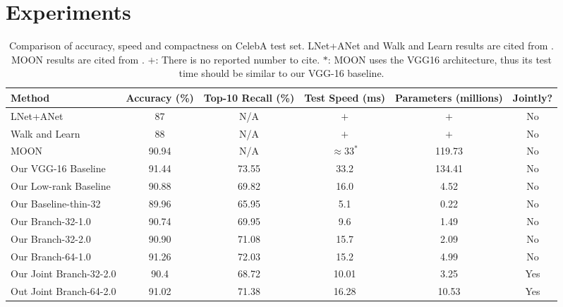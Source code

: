 \documentclass[10pt,twocolumn,letterpaper]{article}
\begin{document}
\section{Experiments}

\begin{table*}
	\begin{center} \small
		\begin{tabular}{|l|c|c|c|c|c|}
			\hline
			\bf Method & \bf Accuracy (\%) & \bf Top-10 Recall (\%) & \bf Test Speed (ms) & \bf Parameters (millions) & \bf Jointly? \\ \hline
			LNet+ANet & 87 & N/A & $+$ & $+$ & No \\
			Walk and Learn & 88 & N/A & $+$ & $+$ & No \\
			MOON & 90.94 & N/A & $\approx 33^*$ & 119.73 & No \\ \hline
			Our VGG-16 Baseline & 91.44 & 73.55 & 33.2 & 134.41 & No \\
			Our Low-rank Baseline & 90.88 & 69.82 & 16.0 & 4.52 & No \\
			Our Baseline-thin-32 & 89.96 & 65.95 & 5.1 & 0.22 & No \\ \hline
			Our Branch-32-1.0 & 90.74 & 69.95 & 9.6 & 1.49 & No \\
			Our Branch-32-2.0 & 90.90 & 71.08 & 15.7 & 2.09 & No \\
			Our Branch-64-1.0 & 91.26 & 72.03 & 15.2 & 4.99 & No \\ \hline
			Our Joint Branch-32-2.0 & 90.4 & 68.72 & 10.01 & 3.25 & Yes \\
			Out Joint Branch-64-2.0 & 91.02 & 71.38 & 16.28 & 10.53 & Yes \\
			\hline
		\end{tabular}
	\end{center}
	\caption{Comparison of accuracy, speed and compactness on CelebA test set. LNet+ANet and Walk and Learn results are cited from \cite{wang2016walk}. MOON results are cited from \cite{rudd2016moon}. $+$: There is no reported number to cite. $*$: MOON uses the VGG16 architecture, thus its test time should be similar to our VGG-16 baseline.}
	\label{tab:celeba_complexity}
\end{table*}
\end{document}
